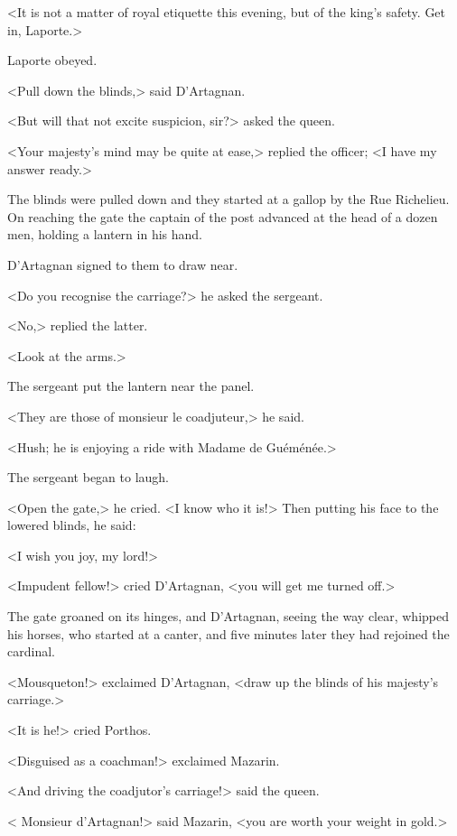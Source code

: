 <It is not a matter of royal etiquette this evening, but of the king's safety. Get in, Laporte.>

Laporte obeyed.

<Pull down the blinds,> said D'Artagnan.

<But will that not excite suspicion, sir?> asked the queen.

<Your majesty's mind may be quite at ease,> replied the officer; <I have my answer ready.>

The blinds were pulled down and they started at a gallop by the Rue Richelieu. On reaching the gate the captain of the post advanced at the head of a dozen men, holding a lantern in his hand.

D'Artagnan signed to them to draw near.

<Do you recognise the carriage?> he asked the sergeant.

<No,> replied the latter.

<Look at the arms.>

The sergeant put the lantern near the panel.

<They are those of monsieur le coadjuteur,> he said.

<Hush; he is enjoying a ride with Madame de Guéménée.>

The sergeant began to laugh.

<Open the gate,> he cried. <I know who it is!> Then putting his face to the lowered blinds, he said:

<I wish you joy, my lord!>

<Impudent fellow!> cried D'Artagnan, <you will get me turned off.>

The gate groaned on its hinges, and D'Artagnan, seeing the way clear, whipped his horses, who started at a canter, and five minutes later they had rejoined the cardinal.

<Mousqueton!> exclaimed D'Artagnan, <draw up the blinds of his majesty's carriage.>

<It is he!> cried Porthos.

<Disguised as a coachman!> exclaimed Mazarin.

<And driving the coadjutor's carriage!> said the queen.

< Monsieur d'Artagnan!> said Mazarin, <you are worth your weight in gold.> 